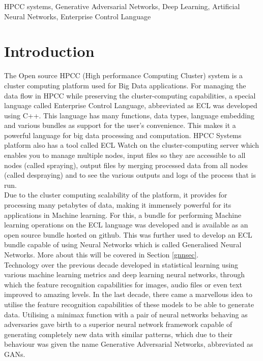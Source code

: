 \documentclass[conference]{IEEEtran}
\begin{document}
\begin{IEEEkeywords}
HPCC systems, 
Generative Adversarial Networks,
Deep Learning,
Artificial Neural Networks,
Enterprise Control Language
\end{IEEEkeywords}

\section{Introduction}\label{Intro}

The Open source HPCC (High performance Computing Cluster) system is a cluster computing platform used for Big Data applications\cite{abouthpcc}. For managing the data flow in HPCC while preserving the cluster-computing capabilities, a special language called Enterprise Control Language, abbreviated as ECL was developed using C++. This language has many functions, data types, language embedding and various bundles as support for the user's convenience. This makes it a powerful language for big data processing and computation. HPCC Systems platform also has a tool called ECL Watch on the cluster-computing server which enables you to manage multiple nodes, input files so they are accessible to all nodes (called spraying), output files by merging processed data from all nodes (called despraying) and to see the various outputs and logs of the process that is run\cite{eclguide}.
\\
Due to the cluster computing scalability of the platform, it provides for processing many petabytes of data, making it immensely powerful for its applications in Machine learning. For this, a bundle for performing Machine learning operations on the ECL language was developed and is available as an open source bundle hosted on github\cite{mlcore}. This was further used to develop an ECL bundle capable of using Neural Networks which is called Generalised Neural Networks\cite{gnn}. More about this will be covered in Section \ref{gnnsec}.
\\
Technology over the previous decade developed in statistical learning using various machine learning metrics and deep learning neural networks, through which the feature recognition capabilities for images, audio files or even text improved to amazing levels. In the last decade, there came a marvellous idea to utilise the feature recognition capabilities of these models to be able to generate data. Utilising a minimax function with a pair of neural networks behaving as adversaries gave birth to a superior neural network framework capable of generating completely new data with similar patterns, which due to their behaviour was given the name Generative Adversarial Networks, abbreviated as GANs.
\end{document}
